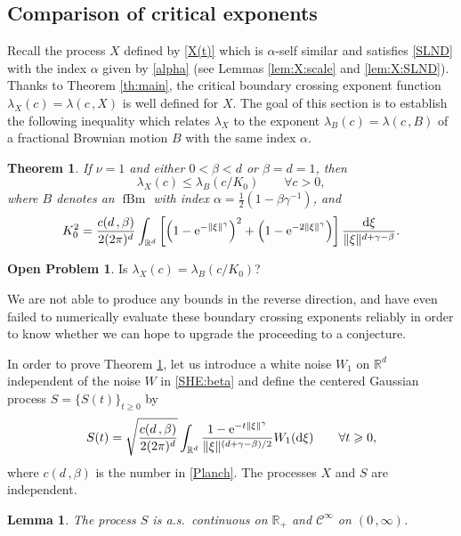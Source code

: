 \documentclass[reqno]{amsart}
\DeclareMathOperator{\fBm}{fBm}
\newcommand{\<}{\langle}
\renewcommand{\>}{\rangle}
\newcommand{\R}{\mathbb{R}}
\newcommand{\cC}{\mathcal{C}}
\newcommand{\1}{\mathbb{1}}
\renewcommand{\d}{{\rm d}}
\newcommand{\e}{{\rm e}}
\renewcommand{\ge}{\geqslant}
\renewcommand{\le}{\leqslant}
\newtheorem{theorem}[stat]{Theorem}
\newtheorem{lemma}[stat]{Lemma}
\theoremstyle{definition}
\newtheorem{OP}[stat]{Open Problem}
\numberwithin{equation}{section}
\begin{document}
\subsection{Comparison of critical exponents}\label{sec:comparison}

Recall the process $X$ defined by \eqref{X(t)} which is $\alpha$-self similar 
and satisfies \eqref{SLND} with the index $\alpha$ given by \eqref{alpha} 
(see Lemmas \ref{lem:X:scale} and \ref{lem:X:SLND}).
Thanks to Theorem \ref{th:main}, the critical boundary crossing exponent function 
$\lambda_X(c) = \lambda(c\,,X)$ is well defined for $X$.
The goal of this section is to establish the following inequality which 
relates $\lambda_X$ to the exponent 
$\lambda_B(c) = \lambda(c\,,B)$ of a fractional Brownian 
motion $B$ with the same index $\alpha$.

\begin{theorem}\label{th:crit:exp}
	If $\nu=1$ and either $0<\beta<d$ or $\beta=d=1$, then
	\[
		\lambda_X(c) \le \lambda_B(c/K_0)
		\qquad\forall c>0,
	\]
	where $B$ denotes an $\fBm$ with index $\alpha = \frac12 (1-\beta\gamma^{-1})$,
	and 
	\begin{align}\label{K_0}
		K_0^2 = \frac{c(d\,,\beta)}{2(2\pi)^d} 
		\int_{\R^d} \left[ \left( 1-\e^{-\|\xi\|^\gamma} \right)^2  
		+\left( 1-\e^{-2\|\xi\|^\gamma} \right)  \right] 
		\frac{\d \xi}{\|\xi\|^{d+\gamma-\beta}}.
	\end{align}
\end{theorem}

\begin{OP}
	Is $\lambda_X(c) = \lambda_B(c/K_0)$?
\end{OP}
We are not able to produce any bounds in the reverse direction, and have even
failed to numerically evaluate these boundary crossing exponents reliably in order
to know whether we can hope to upgrade the proceeding to a conjecture.

In order to prove Theorem \ref{th:crit:exp}, 
let us introduce a white noise $W_1$ on $\R^d$ independent of the noise $W$ in \eqref{SHE:beta} and define the centered Gaussian process $S=\{S(t)\}_{t \ge 0}$ by
\begin{align}\label{S}
	S(t) = \sqrt{\frac{c(d\,,\beta)}{2(2\pi)^{d}}} \int_{\R^d} \frac{1-\e^{-t\|\xi\|^\gamma}}{\|\xi\|^{(d+\gamma-\beta)/2}} W_1(\d\xi) \qquad \forall t \ge 0,
\end{align}
where $c(d\,,\beta)$ is the number in \eqref{Planch}.
The processes $X$ and $S$ are independent.


\begin{lemma}\label{lem:S:cont}
	The process $S$ is a.s.~continuous on $\R_+$ and $\cC^\infty$ on $(0\,,\infty)$.
\end{lemma}
\end{document}
